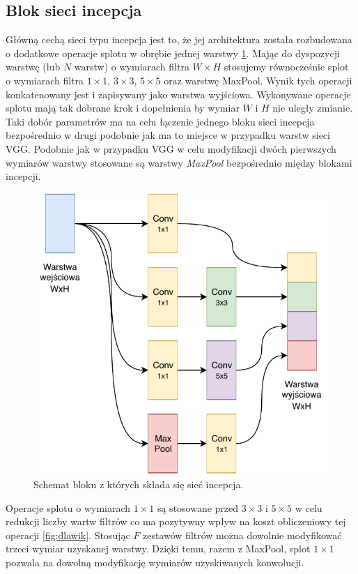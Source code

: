 \subsection{Blok sieci incepcja}
\label{subsection:inception-block}
Główną cechą sieci typu incepcja jest to, że jej architektura została rozbudowana o dodatkowe operacje splotu w obrębie jednej warstwy \ref{fig:inception-block}.
Mając do dyspozycji warstwę (lub \(N\) warstw) o wymiarach filtra \(W \times H\) stosujemy równocześnie splot o wymiarach filtra \(1 \times 1\), \(3 \times 3\), \(5 \times 5\) oraz warstwę MaxPool. 
Wynik tych operacji konkatenowany jest i zapisywany jako warstwa wyjściowa. Wykonywane operacje splotu mają tak dobrane krok i dopełnienia by wymiar \(W\) i \(H\) nie uległy zmianie. 
Taki dobór parametrów ma na celu łączenie jednego bloku sieci incepcja bezpośrednio w drugi podobnie jak ma to miejsce w przypadku warstw sieci VGG. 
Podobnie jak w przypadku VGG w celu modyfikacji dwóch pierwszych wymiarów warstwy stosowane są warstwy \textit{MaxPool} bezpośrednio między blokami incepcji.

\begin{figure}[ht]
\centerline{\includegraphics[scale=1]{resources/Inception_block.pdf}}
\caption{Schemat bloku z których składa się sieć incepcja.}
\label{fig:inception-block}
\end{figure}

Operacje splotu o wymiarach \(1 \times 1\) są stosowane przed \(3 \times 3\) i \(5 \times 5\) w celu redukcji liczby wartw filtrów co ma pozytywny wpływ na koszt obliczeniowy tej operacji \ref{fig:dlawik}.
Stosując \(F\) zestawów filtrów można dowolnie modyfikować trzeci wymiar uzyskanej warstwy. Dzięki temu, razem z MaxPool, splot \(1 \times 1\) pozwala na dowolną modyfikację wymiarów uzyskiwanych konwolucji.

